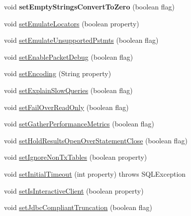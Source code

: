 \begin{DoxyCompactItemize}
void {\bfseries set\+Empty\+Strings\+Convert\+To\+Zero} (boolean flag)
\item 
void \mbox{\hyperlink{classcom_1_1mysql_1_1jdbc_1_1_connection_properties_impl_ae17303315356fd3fd01afaf4f6ad153a}{set\+Emulate\+Locators}} (boolean property)
\item 
void \mbox{\hyperlink{classcom_1_1mysql_1_1jdbc_1_1_connection_properties_impl_ac73c75361124d86d110a7c39373e2b49}{set\+Emulate\+Unsupported\+Pstmts}} (boolean flag)
\item 
void \mbox{\hyperlink{classcom_1_1mysql_1_1jdbc_1_1_connection_properties_impl_a0ae3082906adfaa1abbc22bfb8ca865f}{set\+Enable\+Packet\+Debug}} (boolean flag)
\item 
void \mbox{\hyperlink{classcom_1_1mysql_1_1jdbc_1_1_connection_properties_impl_a5f45b9839aa3927e82911163c4c5fb03}{set\+Encoding}} (String property)
\item 
void \mbox{\hyperlink{classcom_1_1mysql_1_1jdbc_1_1_connection_properties_impl_a1b81f63fa5225f51a4cc0a7cf1a2c593}{set\+Explain\+Slow\+Queries}} (boolean flag)
\item 
void \mbox{\hyperlink{classcom_1_1mysql_1_1jdbc_1_1_connection_properties_impl_ac6e1b879525591a11a40c18e1ec96ba4}{set\+Fail\+Over\+Read\+Only}} (boolean flag)
\item 
void \mbox{\hyperlink{classcom_1_1mysql_1_1jdbc_1_1_connection_properties_impl_a2a1efea1f2a6d8de6700a188a7d10341}{set\+Gather\+Performance\+Metrics}} (boolean flag)
\item 
void \mbox{\hyperlink{classcom_1_1mysql_1_1jdbc_1_1_connection_properties_impl_a4d50d1c91f82a50ecff1012758beaa75}{set\+Hold\+Results\+Open\+Over\+Statement\+Close}} (boolean flag)
\item 
void \mbox{\hyperlink{classcom_1_1mysql_1_1jdbc_1_1_connection_properties_impl_a09f67907a067022f4a415a77ea6872b0}{set\+Ignore\+Non\+Tx\+Tables}} (boolean property)
\item 
void \mbox{\hyperlink{classcom_1_1mysql_1_1jdbc_1_1_connection_properties_impl_afcb603e0165494b6f9a1d0bf6b43e71c}{set\+Initial\+Timeout}} (int property)  throws S\+Q\+L\+Exception 
\item 
void \mbox{\hyperlink{classcom_1_1mysql_1_1jdbc_1_1_connection_properties_impl_a3c7b14f4dad2d26029d71084eaec57b0}{set\+Is\+Interactive\+Client}} (boolean property)
\item 
void \mbox{\hyperlink{classcom_1_1mysql_1_1jdbc_1_1_connection_properties_impl_a32bf4d4210996a1759f6a350e9c3689a}{set\+Jdbc\+Compliant\+Truncation}} (boolean flag)

\end{DoxyCompactItemize}

